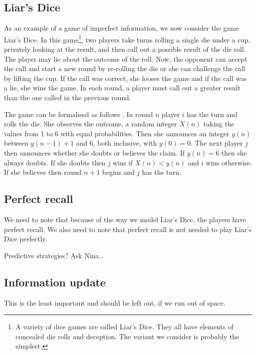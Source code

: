 \subsection{Liar's Dice}

As an example of a game of imperfect information, we now consider the game Liar's Dice. In this game\footnote{A variety of dice games are called Liar's Dice. They all have elements of concealed die rolls and deception. The variant we consider is probably the simplest.}, two players take turns rolling a single die under a cup, privately looking at the result, and then call out a possible result of the die roll. The player may lie about the outcome of the roll. Now, the opponent can accept the call and start a new round by re-rolling the die or she can challenge the call by lifting the cup. If the call was correct, she looses the game and if the call was a lie, she wins the game. In each round, a player must call out a greater result than the one called in the previous round.

The game can be formalised as follows \cite{ferguson1991}. In round $n$ player $i$ has the turn and rolls the die. She observes the outcome, a random integer $X(n)$ taking the values from 1 to 6 with equal probabilities. Then she announces an integer $y(n)$ between $y(n-1)+1$ and 6, both inclusive, with $y(0) = 0$. The next player $j$ then announces whether she doubts or believes the claim. If $y(n)=6$ then she always doubts. If she doubts then $j$ wins if $X(n) < y(n)$ and $i$ wins otherwise. If she believes then round $n+1$ begins and $j$ has the turn.

\subsection{Perfect recall}

{ \color{red} We need to note that because of the way we model Liar's Dice, the players have perfect recall. We also need to note that perfect recall is not needed to play Liar's Dice perfectly. }

{ \color{red} Predictive strategies? Ask Nina\dots }

\subsection{Information update}

{ \color{red} This is the least important and should be left out, if we run out of space. }